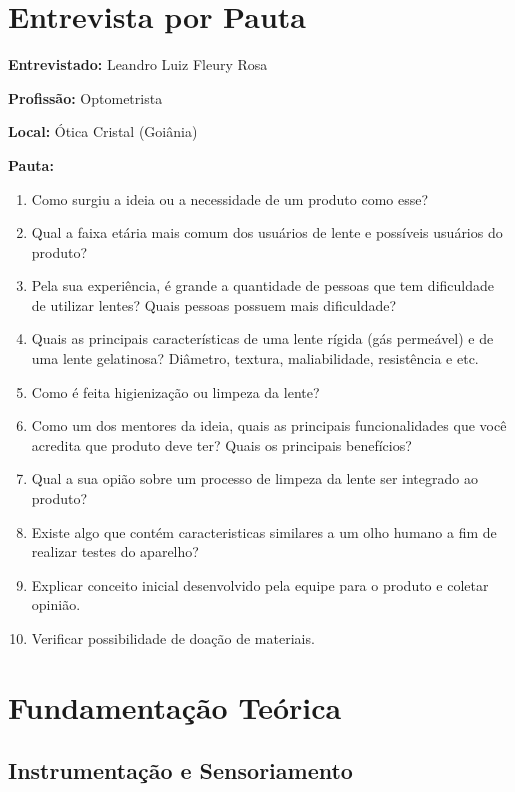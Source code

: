 \begin{anexosenv}


\chapter{Entrevista por Pauta}

\textbf{Entrevistado:} Leandro Luiz Fleury Rosa

\textbf{Profissão:} Optometrista

\textbf{Local:} Ótica Cristal (Goiânia)

\textbf{Pauta:}

\begin{enumerate}
\item Como surgiu a ideia ou a necessidade de um produto como esse?
\item Qual a faixa etária mais comum dos usuários de lente e possíveis usuários do produto?
\item Pela sua experiência, é grande a quantidade de pessoas que tem dificuldade de utilizar lentes? Quais pessoas possuem mais dificuldade?
\item Quais as principais características de uma lente rígida (gás permeável) e de uma lente gelatinosa? Diâmetro, textura, maliabilidade, resistência e etc.
\item Como é feita higienização ou limpeza da lente?
\item Como um dos mentores da ideia, quais as principais funcionalidades que você acredita que produto deve ter? Quais os principais benefícios?
\item Qual a sua opião sobre um processo de limpeza da lente ser integrado ao produto?
\item Existe algo que contém caracteristicas similares a um olho humano a fim de realizar testes do aparelho?
\item Explicar conceito inicial desenvolvido pela equipe para o produto e coletar opinião. 
\item Verificar possibilidade de doação de materiais.
\end{enumerate}


\chapter{Fundamentação Teórica}

\section[Instrumentação e Sensoriamento]{Instrumentação e Sensoriamento}


\end{anexosenv}
